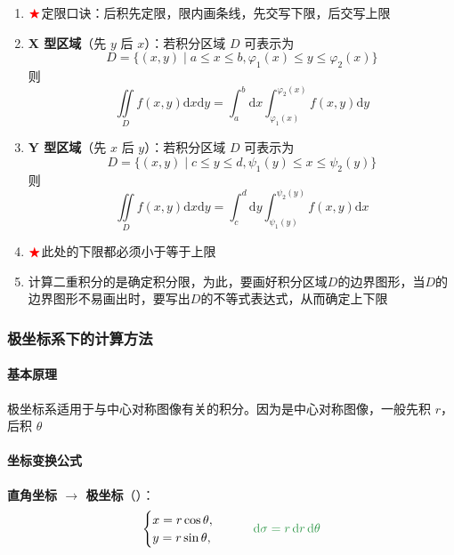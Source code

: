\documentclass[../book.tex]{subfiles}
\begin{document}
    \begin{enumerate}
        \item $\color{red}{\bigstar}$定限口诀：后积先定限，限内画条线，先交写下限，后交写上限
        \item \textbf{X 型区域}（先 $y$ 后 $x$）：若积分区域 $D$ 可表示为
        \[
            D = \{(x,y) \mid a \leq x \leq b, \varphi_1(x) \leq y \leq \varphi_2(x)\}
        \]
        则
        \[
            \iint\limits_D f(x,y) \mathrm{d}x\mathrm{d}y = \int_a^b \mathrm{d}x \int_{\varphi_1(x)}^{\varphi_2(x)} f(x,y) \mathrm{d}y
        \]

        \item \textbf{Y 型区域}（先 $x$ 后 $y$）：若积分区域 $D$ 可表示为
        \[
            D = \{(x,y) \mid c \leq y \leq d, \psi_1(y) \leq x \leq \psi_2(y)\}
        \]
        则
        \[
            \iint\limits_D f(x,y) \mathrm{d}x\mathrm{d}y = \int_c^d \mathrm{d}y \int_{\psi_1(y)}^{\psi_2(y)} f(x,y) \mathrm{d}x
        \]
        \item $\color{red}{\bigstar}$此处的下限都必须小于等于上限
        \item 计算二重积分的{\color{red}{关键}}是确定积分限，为此，要画好积分区域$D$的边界图形，当$D$的边界图形不易画出时，要写出$D$的不等式表达式，从而确定上下限
    \end{enumerate}

    \subsubsection{极坐标系下的计算方法}

    \paragraph{基本原理}

    极坐标系适用于与中心对称图像有关的积分。因为是中心对称图像，一般先积 $r$，后积 $\theta$

    \paragraph{坐标变换公式}

    \textbf{直角坐标 $\to$ 极坐标}（{\color{red}{换元}}）：
    \[
        \begin{cases}
            x = r\cos\theta, \\
            y = r\sin\theta,
        \end{cases}
        \qquad \gmath{\mathrm{d}\sigma = r\,\mathrm{d}r\,\mathrm{d}\theta}
    \]
\end{document}
